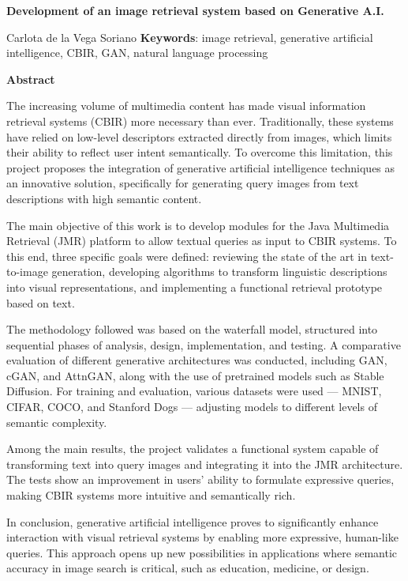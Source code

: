 \centering
\textbf{Development of an image retrieval system based on Generative A.I.}
\vspace{0.5cm}

Carlota de la Vega Soriano
\vspace{0.5cm}
\justify
\textbf{Keywords}: image retrieval, generative artificial intelligence, CBIR, GAN, natural language processing
\vspace{1cm}

\justify
\textbf{Abstract}

The increasing volume of multimedia content has made visual information retrieval systems (CBIR) more necessary than ever. Traditionally, these systems have relied on low-level descriptors extracted directly from images, which limits their ability to reflect user intent semantically. To overcome this limitation, this project proposes the integration of generative artificial intelligence techniques as an innovative solution, specifically for generating query images from text descriptions with high semantic content.

The main objective of this work is to develop modules for the Java Multimedia Retrieval (JMR) platform to allow textual queries as input to CBIR systems. To this end, three specific goals were defined: reviewing the state of the art in text-to-image generation, developing algorithms to transform linguistic descriptions into visual representations, and implementing a functional retrieval prototype based on text.

The methodology followed was based on the waterfall model, structured into sequential phases of analysis, design, implementation, and testing. A comparative evaluation of different generative architectures was conducted, including GAN, cGAN, and AttnGAN, along with the use of pretrained models such as Stable Diffusion. For training and evaluation, various datasets were used — MNIST, CIFAR, COCO, and Stanford Dogs — adjusting models to different levels of semantic complexity.

Among the main results, the project validates a functional system capable of transforming text into query images and integrating it into the JMR architecture. The tests show an improvement in users’ ability to formulate expressive queries, making CBIR systems more intuitive and semantically rich.

In conclusion, generative artificial intelligence proves to significantly enhance interaction with visual retrieval systems by enabling more expressive, human-like queries. This approach opens up new possibilities in applications where semantic accuracy in image search is critical, such as education, medicine, or design.